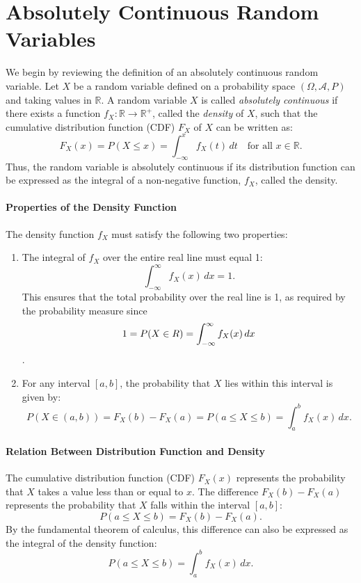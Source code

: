 \section{Absolutely Continuous Random Variables}
    We begin by reviewing the definition of an absolutely continuous random variable. Let $X$ be a random variable defined on a probability space $(\Omega, \mathcal{A}, P)$ and taking values in $\mathbb{R}$. A random variable $X$ is called \textit{absolutely continuous} if there exists a function $f_X: \mathbb{R} \to \mathbb{R}^+$, called the \textit{density} of $X$, such that the cumulative distribution function (CDF) $F_X$ of $X$ can be written as:
    \[
    F_X(x) = P(X \leq x) = \int_{-\infty}^{x} f_X(t) \, dt \quad \text{for all } x \in \mathbb{R}.
    \]
    Thus, the random variable is absolutely continuous if its distribution function can be expressed as the integral of a non-negative function, $f_X$, called the density.
    
    \paragraph{Properties of the Density Function}
    The density function $f_X$ must satisfy the following two properties:
    \begin{enumerate}
        \item The integral of $f_X$ over the entire real line must equal 1:
        \[
        \int_{-\infty}^{\infty} f_X(x) \, dx = 1.
        \]
        This ensures that the total probability over the real line is 1, as required by the probability measure since
        \[
        1 = P(X \in \mathcal\mathbb{R}) = \int_{-\infty}^{\infty} f_X(x) \, dx 
        \].
        \item For any interval $[a, b]$, the probability that $X$ lies within this interval is given by:
        \[
        P(X\in (a,b)) = F_X(b) - F_X(a) = P(a \leq X \leq b) = \int_{a}^{b} f_X(x) \, dx.
        \]
    \end{enumerate}
    
    \paragraph{Relation Between Distribution Function and Density}
    The cumulative distribution function (CDF) $F_X(x)$ represents the probability that $X$ takes a value less than or equal to $x$. The difference $F_X(b) - F_X(a)$ represents the probability that $X$ falls within the interval $[a, b]$:
    \[
    P(a \leq X \leq b) = F_X(b) - F_X(a).
    \]
    By the fundamental theorem of calculus, this difference can also be expressed as the integral of the density function:
    \[
    P(a \leq X \leq b) = \int_{a}^{b} f_X(x) \, dx.
    \]
    
